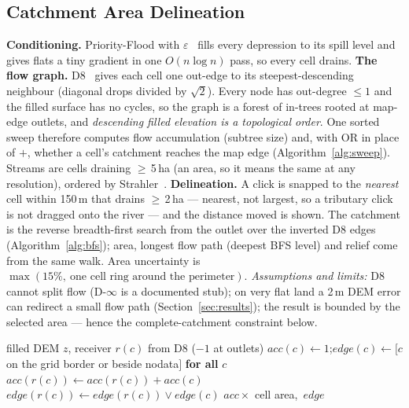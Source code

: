\documentclass[manuscript,screen,review]{acmart}
\begin{document}
\subsection{Catchment Area Delineation}
\textbf{Conditioning.} Priority-Flood with $\varepsilon$~\cite{barnes2014,wang2006} fills
every depression to its spill level and gives flats a tiny gradient in one $O(n\log n)$ pass,
so every cell drains. \textbf{The flow graph.} D8~\cite{ocallaghan1984} gives each cell one
out-edge to its steepest-descending neighbour (diagonal drops divided by $\sqrt2$). Every
node has out-degree $\le 1$ and the filled surface has no cycles, so the graph is a forest of
in-trees rooted at map-edge outlets, and \emph{descending filled elevation is a topological
order}. One sorted sweep therefore computes flow accumulation (subtree size) and, with OR in
place of $+$, whether a cell's catchment reaches the map edge (Algorithm~\ref{alg:sweep}).
Streams are cells draining $\ge$\,5\,ha (an area, so it means the same at any resolution),
ordered by Strahler~\cite{strahler1957}.
\textbf{Delineation.} A click is snapped to the \emph{nearest} cell within 150\,m that drains
$\ge$\,2\,ha --- nearest, not largest, so a tributary click is not dragged onto the river ---
and the distance moved is shown. The catchment is the reverse breadth-first search from the
outlet over the inverted D8 edges (Algorithm~\ref{alg:bfs}); area, longest flow path (deepest
BFS level) and relief come from the same walk. Area uncertainty is
$\max(15\%,\ \text{one cell ring around the perimeter})$. \emph{Assumptions and limits:} D8
cannot split flow (D-$\infty$ is a documented stub); on very flat land a 2\,m DEM error can
redirect a small flow path (Section~\ref{sec:results}); the result is bounded by the selected
area --- hence the complete-catchment constraint below.

\begin{algorithm}[h]
\caption{One topological sweep: accumulation and edge-fed flags --- $O(n\log n)$}\label{alg:sweep}
\small
\begin{algorithmic}[1]
\Require filled DEM $z$, receiver $r(c)$ from D8 ($-1$ at outlets)
\State $acc(c)\gets 1$;\quad $edge(c)\gets [c$ on the grid border or beside nodata$]$ \textbf{for all} $c$
 
    \State $acc(r(c)) \gets acc(r(c)) + acc(c)$ 
    \State $edge(r(c)) \gets edge(r(c)) \lor edge(c)$ 
  \EndIf
\EndFor
\State \Return $acc \times$ cell area,\ $edge$
\end{algorithmic}
\end{algorithm}
\end{document}
